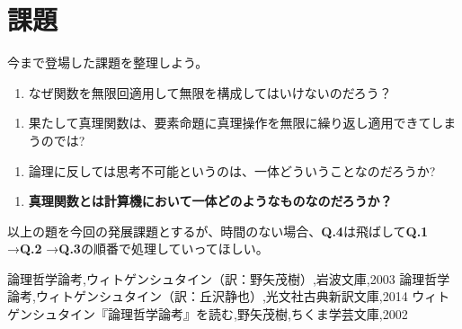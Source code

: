 \documentclass[a4paper,onecolumn,article]{jarticle}
\newcounter{ct}               %
\begin{document}
\section{課題}

今まで登場した課題を整理しよう。

{\bf
\setcounter{ct}{1}

\begin{enumerate}
  \item なぜ関数を無限回適用して無限を構成してはいけないのだろう？
\end{enumerate}

\begin{enumerate}
  \item 果たして真理関数は、要素命題に真理操作を無限に繰り返し適用できてしまうのでは?
\end{enumerate}

\begin{enumerate}
  \item 論理に反しては思考不可能というのは、一体どういうことなのだろうか?
\end{enumerate}

\begin{enumerate}
  \item {\bf 真理関数とは計算機において一体どのようなものなのだろうか？ }
\end{enumerate}

}
\addtocounter{ct}{-1}
以上の題を今回の発展課題とするが、時間のない場合、{\bf Q.4}は飛ばして{\bf Q.1 }→{\bf Q.2 }→{\bf Q.3}の順番で処理していってほしい。

\begin{thebibliography}{9}
   論理哲学論考,ウィトゲンシュタイン（訳：野矢茂樹）,岩波文庫,2003
   論理哲学論考,ウィトゲンシュタイン（訳：丘沢静也）,光文社古典新訳文庫,2014
   ウィトゲンシュタイン『論理哲学論考』を読む,野矢茂樹,ちくま学芸文庫,2002
\end{thebibliography}
\end{document}
